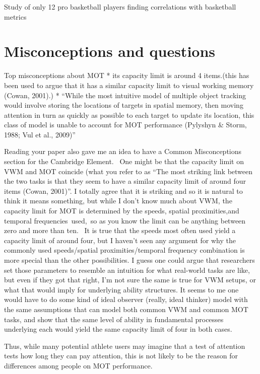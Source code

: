 \documentclass[]{book}
\begin{document}
Study of only 12 pro basketball players finding correlations with basketball metrics \citet{mangineVisualTrackingSpeed2014}

\hypertarget{misconceptions-and-questions}{%
\chapter{Misconceptions and questions}\label{misconceptions-and-questions}}

Top misconceptions about MOT
* its capacity limit is around 4 items.(this has been used to argue that it has a similar capacity limit to visual working memory (Cowan, 2001).)
* ``While the most intuitive model of multiple object tracking would involve storing the locations of targets in spatial memory, then moving attention in turn as quickly as possible to each target to update its location, this class of model is unable to account for MOT performance (Pylyshyn \& Storm, 1988; Vul et al., 2009)''

Reading your paper also gave me an idea to have a Common Misconceptions section for the Cambridge Element.~ One might be that the capacity limit on VWM and MOT coincide (what you refer to as ``The most striking link between the two tasks is that they seem to have a similar capacity limit of around four items (Cowan, 2001)''. I totally agree that it is striking and so it is natural to think it means something, but while I don't know much about VWM, the capacity limit for MOT is determined by the speeds, spatial proximities,and temporal frequencies~used,~so as you know the limit can be anything between zero and more than ten.~ It is true that the speeds most often used yield a capacity limit of around four, but I haven't seen any argument for why the commonly used speeds/spatial proximities/temporal frequency combination is more special than the other possibilities. I guess one could argue that researchers set those parameters to resemble an intuition for what real-world tasks are like, but even if they got that right, I'm not sure the same is true for VWM setups, or what that would imply for underlying ability structures. It seems to me one would have to do some kind of ideal observer (really, ideal thinker) model with the same assumptions that can model both common VWM and common MOT tasks, and show that the same level of ability in fundamental processes underlying each would yield the same capacity limit of four in both cases.

Thus, while many potential athlete users may imagine that a test of attention tests how long they can pay attention, this is not likely to be the reason for differences among people on MOT performance.
\end{document}
